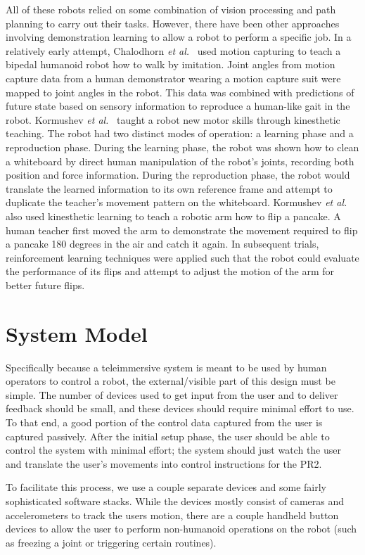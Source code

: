 \documentclass{sig-alternate}
\begin{document}
All of these robots relied on some combination of vision processing and path planning to carry out their tasks. However, there have been other approaches involving demonstration learning to allow a robot to perform a specific job. In a relatively early attempt, Chalodhorn \textit{et al.}~\cite{walk_imitation} used motion capturing to teach a bipedal humanoid robot how to walk by imitation. Joint angles from motion capture data from a human demonstrator wearing a motion capture suit were mapped to joint angles in the robot. This data was combined with predictions of future state based on sensory information to reproduce a human-like gait in the robot. Kormushev \textit{et al.}~\cite{whiteboard} taught a robot new motor skills through kinesthetic teaching. The robot had two distinct modes of operation: a learning phase and a reproduction phase. During the learning phase, the robot was shown how to clean a whiteboard by direct human manipulation of the robot's joints, recording both position and force information. During the reproduction phase, the robot would translate the learned information to its own reference frame and attempt to duplicate the teacher's movement pattern on the whiteboard.  Kormushev \textit{et al.}~\cite{pancakes} also used kinesthetic learning to teach a robotic arm how to flip a pancake. A human teacher first moved the arm to demonstrate the movement required to flip a pancake 180 degrees in the air and catch it again. In subsequent trials, reinforcement learning techniques were applied such that the robot could evaluate the performance of its flips and attempt to adjust the motion of the arm for better future flips.

\section{System Model}
Specifically because a teleimmersive system is meant to be used by human 
operators to control a robot, the external/visible part of this
design must be simple. The number of devices used to get input from the user 
and to deliver feedback should be small, and these devices should require
minimal effort to use. To that
end, a good portion of the control data captured from the user is captured
passively. After the initial setup phase, the user should be able to control
the system with minimal effort; the system should just watch the user and
translate the user's movements into control instructions for the PR2.

To facilitate this process, we use a couple separate devices and some
fairly sophisticated software stacks. While the
devices mostly consist of cameras and accelerometers to track the users 
motion, there are a couple handheld button devices to allow the user to
perform non-humanoid operations on the robot (such as freezing a joint or
triggering certain routines).
\end{document}
